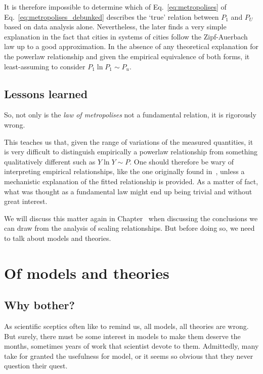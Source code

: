 It is therefore impossible to determine which of
Eq.~\ref{eq:metropolises} of Eq.~\ref{eq:metropolises_debunked} describes the
`true' relation between $P_1$ and $P_U$ based on data analysis alone.
Nevertheless, the later finds a very simple explanation in the fact that cities
in systems of cities follow the Zipf-Auerbach law up to a good
approximation. In the absence of any theoretical explanation for the powerlaw
relationship and given the empirical equivalence of both forms, it
least-assuming to consider $P_1 \ln P_1 \sim P_u$.


\subsection{Lessons learned}
\label{sub:lessons_learned}

So, not only is the \emph{law of metropolises} not a fundamental relation, it is
rigorously wrong. 

This teaches us that, given the range of variations of the measured
quantities, it is very difficult to distinguish empirically a powerlaw
relationship from something qualitatively different such as $Y \ln Y \sim P$.
One should therefore be wary of interpreting empirical relationships,
like the one originally found in~\cite{Pumain:1987}, unless a mechanistic
explanation of the fitted relationship is provided. As a matter of fact, what
was thought as a fundamental law might end up being trivial and without great
interest.

We will discuss this matter again in Chapter~\cite{chap:scaling-implications} when
discussing the conclusions we can draw from the analysis of scaling
relationships. But before doing so, we need to talk about models and theories.


\section{Of models and theories}

\subsection{Why bother?}
\label{sub:why_bother_}

As scientific sceptics often like to remind us, all models, all theories are
wrong. But surely, there must be some interest in models to make them deserve
the months, sometimes years of work that scientist devote to them. Admittedly,
many take for granted the usefulness for model, or it seems so obvious that they
never question their quest.

